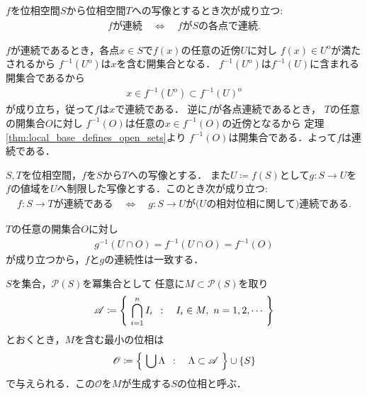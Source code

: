 	\begin{screen}
		\begin{thm}
			$f$を位相空間$S$から位相空間$T$への写像とするとき次が成り立つ:
			\begin{align}
				\mbox{$f$が連続} \quad \Longleftrightarrow \quad
				\mbox{$f$が$S$の各点で連続}.
			\end{align}
		\end{thm}
	\end{screen}
	
	\begin{prf}
		$f$が連続であるとき，各点$x \in S$で$f(x)$の任意の近傍$U$に対し
		$f(x) \in U^{\mathrm{o}}$が満たされるから
		$f^{-1}(U^{\mathrm{o}})$は$x$を含む開集合となる．
		$f^{-1}(U^{\mathrm{o}})$は$f^{-1}(U)$に含まれる開集合であるから
		\begin{align}
			x \in f^{-1}(U^{\mathrm{o}}) \subset f^{-1}(U)^{\mathrm{o}}
		\end{align}
		が成り立ち，従って$f$は$x$で連続である．
		逆に$f$が各点連続であるとき，
		$T$の任意の開集合$O$に対し
		$f^{-1}(O)$は任意の$x \in f^{-1}(O)$の近傍となるから
		定理\ref{thm:local_base_defines_open_sets}より
		$f^{-1}(O)$は開集合である．よって$f$は連続である．
		\QED
	\end{prf}
	
	\begin{screen}
		\begin{thm}[部分空間と制限写像の連続性]
			$S,T$を位相空間，$f$を$S$から$T$への写像とする．
			また$U \coloneqq f(S)$として$g:S \longrightarrow U$を
			$f$の値域を$U$へ制限した写像とする．このとき次が成り立つ:
			\begin{align}
				\mbox{$f:S \longrightarrow T$が連続である} 
				\quad \Longleftrightarrow \quad
				\mbox{$g:S \longrightarrow U$が($U$の相対位相に関して)連続である}.
			\end{align}
		\end{thm}
	\end{screen}
	
	\begin{prf}
		$T$の任意の開集合$O$に対し
		\begin{align}
			g^{-1}(U \cap O) = f^{-1}(U \cap O) = f^{-1}(O)
		\end{align}
		が成り立つから，$f$と$g$の連続性は一致する．
		\QED
	\end{prf}
	
	\begin{screen}
		\begin{thm}[位相の生成]
			$S$を集合，$\mathcal{P}(S)$を冪集合として
			任意に$M \subset \mathcal{P}(S)$を取り
			\begin{align}
				\mathscr{A} \coloneqq
				\left\{\ \bigcap_{i=1}^n I_i\ \, : \quad I_i \in M,\ n = 1,2,\cdots\ \right\}
			\end{align}
			とおくとき，$M$を含む最小の位相は
			\begin{align}
				\mathscr{O} \coloneqq
				\left\{\ \bigcup \Lambda\ \, : \quad \Lambda \subset \mathscr{A}\ \right\}
				\cup \{S\}
			\end{align}
			で与えられる．この$\mathscr{O}$を$M$が生成する$S$の位相と呼ぶ．
		\end{thm}
	\end{screen}
	
